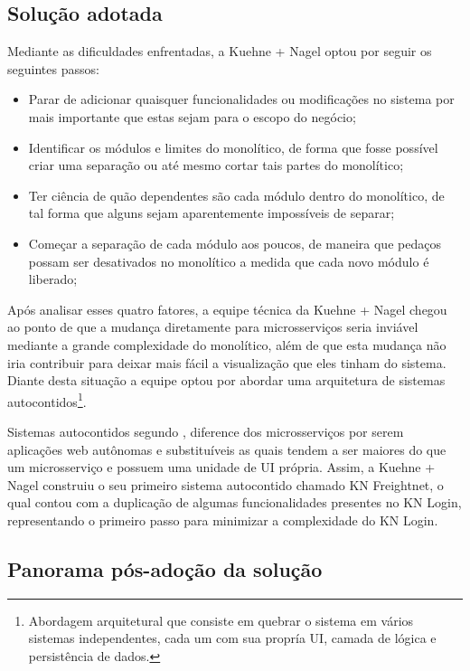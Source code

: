 \subsection{Solução adotada}

Mediante as dificuldades enfrentadas, a Kuehne + Nagel optou por seguir os seguintes passos:

\begin{itemize}
    \item Parar de adicionar quaisquer funcionalidades ou modificações no sistema por mais
        importante que estas sejam para o escopo do negócio;
    \item Identificar os módulos e limites do monolítico, de forma que fosse possível criar uma
        separação ou até mesmo cortar tais partes do monolítico;
    \item Ter ciência de quão dependentes são cada módulo dentro do monolítico, de tal forma que
        alguns sejam aparentemente impossíveis de separar;
    \item Começar a separação de cada módulo aos poucos, de maneira que pedaços possam ser
        desativados no monolítico a medida que cada novo módulo é liberado;
\end{itemize}

Após analisar esses quatro fatores, a equipe técnica da Kuehne + Nagel chegou ao ponto de que a
mudança diretamente para microsserviços seria inviável mediante a grande complexidade do monolítico,
além de que esta mudança não iria contribuir para deixar mais fácil a visualização que eles
tinham do sistema. Diante desta situação a equipe optou por abordar uma arquitetura de sistemas
autocontidos\footnote{Abordagem arquitetural que consiste em quebrar o sistema em vários sistemas
independentes, cada um com sua propría \gls{UI}, camada de lógica e persistência de dados.}.

Sistemas autocontidos segundo , diference dos
microsserviços por serem aplicações web autônomas e substituíveis as quais tendem a ser maiores do
que um microsserviço e possuem uma unidade de \gls{UI} própria. Assim, a Kuehne + Nagel construiu o
seu primeiro sistema autocontido chamado KN Freightnet, o qual contou com a duplicação de algumas
funcionalidades presentes no KN Login, representando o primeiro passo para minimizar a complexidade
do KN Login.

\subsection{Panorama pós-adoção da solução}


